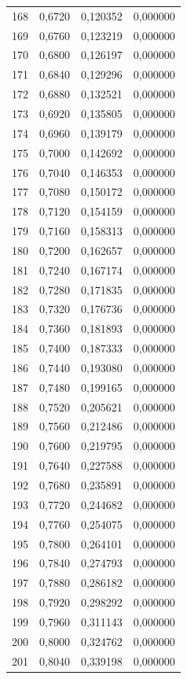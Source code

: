\begin{tabular}{lrrr}
168 & 0,6720 & 0,120352 & 0,000000 \\
169 & 0,6760 & 0,123219 & 0,000000 \\
170 & 0,6800 & 0,126197 & 0,000000 \\
171 & 0,6840 & 0,129296 & 0,000000 \\
172 & 0,6880 & 0,132521 & 0,000000 \\
173 & 0,6920 & 0,135805 & 0,000000 \\
174 & 0,6960 & 0,139179 & 0,000000 \\
175 & 0,7000 & 0,142692 & 0,000000 \\
176 & 0,7040 & 0,146353 & 0,000000 \\
177 & 0,7080 & 0,150172 & 0,000000 \\
178 & 0,7120 & 0,154159 & 0,000000 \\
179 & 0,7160 & 0,158313 & 0,000000 \\
180 & 0,7200 & 0,162657 & 0,000000 \\
181 & 0,7240 & 0,167174 & 0,000000 \\
182 & 0,7280 & 0,171835 & 0,000000 \\
183 & 0,7320 & 0,176736 & 0,000000 \\
184 & 0,7360 & 0,181893 & 0,000000 \\
185 & 0,7400 & 0,187333 & 0,000000 \\
186 & 0,7440 & 0,193080 & 0,000000 \\
187 & 0,7480 & 0,199165 & 0,000000 \\
188 & 0,7520 & 0,205621 & 0,000000 \\
189 & 0,7560 & 0,212486 & 0,000000 \\
190 & 0,7600 & 0,219795 & 0,000000 \\
191 & 0,7640 & 0,227588 & 0,000000 \\
192 & 0,7680 & 0,235891 & 0,000000 \\
193 & 0,7720 & 0,244682 & 0,000000 \\
194 & 0,7760 & 0,254075 & 0,000000 \\
195 & 0,7800 & 0,264101 & 0,000000 \\
196 & 0,7840 & 0,274793 & 0,000000 \\
197 & 0,7880 & 0,286182 & 0,000000 \\
198 & 0,7920 & 0,298292 & 0,000000 \\
199 & 0,7960 & 0,311143 & 0,000000 \\
200 & 0,8000 & 0,324762 & 0,000000 \\
201 & 0,8040 & 0,339198 & 0,000000 \\

\end{tabular}
